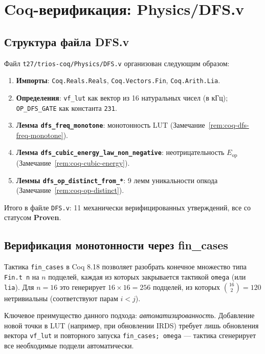 \section{Coq-верификация: Physics/DFS.v}
\label{sec:glava86-coq}

\subsection{Структура файла DFS.v}
\label{subsec:dfs-v-structure}

Файл \texttt{t27/trios-coq/Physics/DFS.v} организован следующим образом:
\begin{enumerate}
  \item \textbf{Импорты}: \texttt{Coq.Reals.Reals},
        \texttt{Coq.Vectors.Fin}, \texttt{Coq.Arith.Lia}.
  \item \textbf{Определения}: \texttt{vf\_lut} как вектор из 16 натуральных
        чисел (в кГц); \texttt{OP\_DFS\_GATE} как константа \texttt{231}.
  \item \textbf{Лемма \texttt{dfs\_freq\_monotone}}: монотонность LUT
        (Замечание~\ref{rem:coq-dfs-freq-monotone}).
  \item \textbf{Лемма \texttt{dfs\_cubic\_energy\_law\_non\_negative}}:
        неотрицательность $E_{\mathrm{op}}$ (Замечание~\ref{rem:coq-cubic-energy}).
  \item \textbf{Леммы \texttt{dfs\_op\_distinct\_from\_*}}:
        9 лемм уникальности опкода (Замечание~\ref{rem:coq-op-distinct}).
\end{enumerate}

Итого в файле \texttt{DFS.v}: 11 механически верифицированных утверждений,
все со статусом \textbf{Proven}.

\subsection{Верификация монотонности через fin\_cases}
\label{subsec:fin-cases}

Тактика \texttt{fin\_cases} в Coq 8.18 позволяет разобрать конечное
множество типа \texttt{Fin.t n} на $n$ подцелей, каждая из которых
закрывается тактикой \texttt{omega} (или \texttt{lia}).  Для $n=16$
это генерирует $16 \times 16 = 256$ подцелей, из которых $\binom{16}{2} = 120$
нетривиальны (соответствуют парам $i < j$).

Ключевое преимущество данного подхода: \emph{автоматизированность}.
Добавление новой точки в LUT (например, при обновлении IRDS) требует
лишь обновления вектора \texttt{vf\_lut} и повторного запуска
\texttt{fin\_cases; omega} — тактика сгенерирует все необходимые
подцели автоматически.

